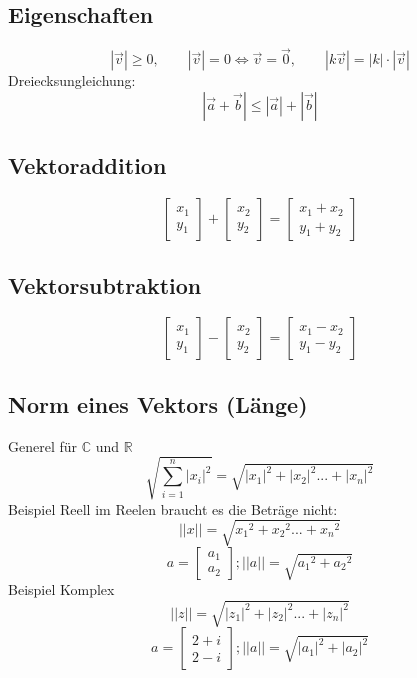 \documentclass[9pt,a4paper]{article}
\begin{document}
    \subsection*{Eigenschaften}
    \[
    |\vec{v}| \ge 0,\qquad
    |\vec{v}| = 0 \Leftrightarrow \vec{v} = \vec{0},\qquad
    |k\vec{v}| = |k|\cdot|\vec{v}|
    \]
    Dreiecksungleichung:
    \[
    |\vec{a}+\vec{b}| \le |\vec{a}| + |\vec{b}|
    \]
    
    
    \subsection{Vektoraddition}
    $$\begin{bmatrix} x_1 \\ y_1 \end{bmatrix} + \begin{bmatrix} x_2 \\ y_2 \end{bmatrix} = \begin{bmatrix} x_1 + x_2 \\ y_1 + y_2\end{bmatrix}$$
    \subsection{Vektorsubtraktion}
    $$\begin{bmatrix} x_1 \\ y_1 \end{bmatrix} - \begin{bmatrix} x_2 \\ y_2 \end{bmatrix} = \begin{bmatrix} x_1 - x_2 \\ y_1 - y_2\end{bmatrix}$$
    \subsection{Norm eines Vektors (Länge)}
    Generel für $\mathbb{C}$ und  $\mathbb{R}$
    $$\sqrt{\sum_{i=1}^n |x_i|^2} =\sqrt{|x_1|^2+|x_2|^2...+|x_n|^2}$$
    Beispiel Reell
    im Reelen braucht es die Beträge nicht:
    $$||x|| = \sqrt{{x_1}^2+{x_2}^2 ... + {x_n}^2}$$
    $$a=\begin{bmatrix}
        a_{1} \\
        a_{2}
    \end{bmatrix}; ||a|| = \sqrt{{a_1}^2+{a_2}^2} $$
    Beispiel Komplex
    $$||z|| = \sqrt{{|z_1|}^2+{|z_2|}^2 ... + {|z_n|}^2}$$
    $$a=\begin{bmatrix}
        2+i \\
        2-i
    \end{bmatrix}; ||a|| = \sqrt{|a_1|^2+|a_2|^2} $$
\end{document}
